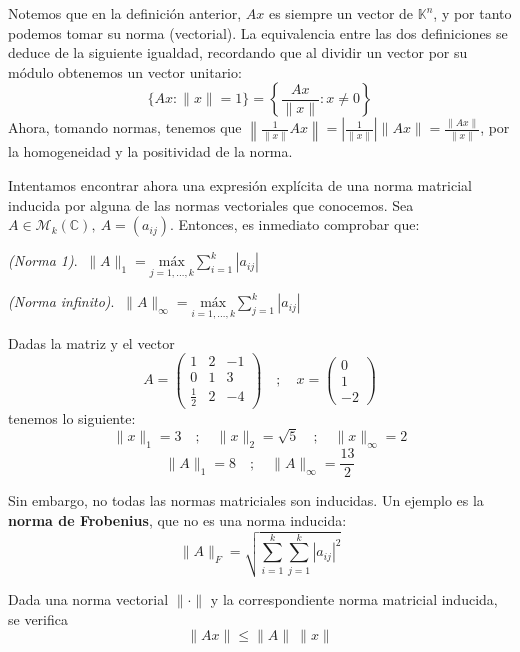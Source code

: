 Notemos que en la definición anterior, $Ax$ es siempre un vector de $\mathbb K^n$, y por tanto podemos tomar su norma (vectorial). La equivalencia entre las dos definiciones se deduce de la siguiente igualdad, recordando que al dividir un vector por su módulo obtenemos un vector unitario: $$\{Ax : \|x\| = 1 \} =  \left\{\frac{Ax}{\|x\|} : x\ne0\right\}$$
Ahora, tomando normas, tenemos que $\displaystyle \left\|\frac{1}{\|x\|}Ax\right\| = \left| \frac{1}{\|x\|}\right| \|Ax\| = \frac{\|Ax\|}{\|x\|}$, por la homogeneidad y la positividad de la norma.

Intentamos encontrar ahora una expresión explícita de una norma matricial inducida por alguna de las normas vectoriales que conocemos. Sea $A \in \mathcal M_k(\mathbb{C}), \ A = (a_{ij})$. Entonces, es inmediato comprobar que:

\begin{nlist}
	\item \textit{(Norma 1)}. $\displaystyle \ \|A\|_1 = \underset{j=1,\dots,k}{\text{máx}} \sum_{i=1}^k |a_{ij}|$
	\item \textit{(Norma infinito)}. $\displaystyle \ \|A\|_\infty = \underset{i=1,\dots,k}{\text{máx}} \sum_{j=1}^k |a_{ij}|$
\end{nlist}

\begin{ejemplo}
    Dadas la matriz y el vector $$A = \begin{pmatrix}
        1 & 2 & -1 \\
        0 & 1 & 3 \\
        \frac{1}{2} & 2 & -4
    \end{pmatrix}\quad;\quad x = \begin{pmatrix}
        0 \\
        1 \\
        -2
    \end{pmatrix}$$
    tenemos lo siguiente: $$
        \|x\|_1 = 3 \quad ; \quad
        \|x\|_2 = \sqrt{5} \quad ; \quad
        \|x\|_{\infty} = 2
$$
$$
        \|A\|_1 = 8 \quad ; \quad
        \|A\|_{\infty} = \frac{13}{2}
$$
\end{ejemplo}

Sin embargo, no todas las normas matriciales son inducidas. Un ejemplo es la \textbf{norma de Frobenius}, que no es una norma inducida: $$\|A\|_F = \sqrt{\sum_{i=1}^k \sum_{j=1}^k |a_{ij}|^2}$$

\begin{nprop} \label{norma_matricial_vec}
    Dada una norma vectorial $\|\cdot\|$ y la correspondiente norma matricial inducida, se verifica $$\|Ax\| \leq \|A\| \ \|x\|$$
\end{nprop}

